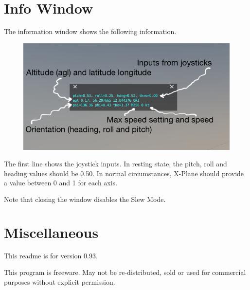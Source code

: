 \documentclass[a4paper,12pt]{article}
\begin{document}

\clearpage
\section*{Info Window}

The information window shows the following information. 

\begin{figure}[h!]%
\centering
\includegraphics[width=1.0\textwidth]{infowindow.png}
\label{fig:infowindow}
\end{figure}

The first line shows the joystick inputs. In resting state, the pitch, roll and
heading values should be 0.50. In normal circumstances, X-Plane should provide a
value between 0 and 1 for each axis.

Note that closing the window disables the Slew Mode.

\vspace{\baselineskip}
\section*{Miscellaneous}

This readme is for version 0.93. 

\vspace{0.5\baselineskip} {\color{text1}This program is freeware. May not be
  re-distributed, sold or used for commercial purposes without explicit
  permission.}
\end{document}
